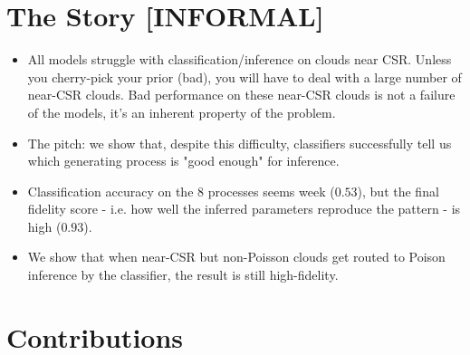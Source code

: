 \documentclass[11pt]{article}
\begin{document}
\newpage
\section*{The Story [INFORMAL]}

\begin{itemize}
    \item All models struggle with classification/inference on clouds near CSR. Unless you cherry-pick your prior (bad), you will have to deal with a large number of near-CSR clouds. Bad performance on these near-CSR clouds is not a failure of the models, it's an inherent property of the problem. 

    \item The pitch: we show that, despite this difficulty, classifiers successfully tell us which generating process is "good enough" for inference.

    \item Classification accuracy on the 8 processes seems week ($0.53$), but the final fidelity score - i.e. how well the inferred parameters reproduce the pattern - is high ($0.93$).
    
    \item We show that when near-CSR but non-Poisson clouds get routed to Poison inference by the classifier, the 
    result is still high-fidelity.
\end{itemize}

\section*{Contributions}
\end{document}
